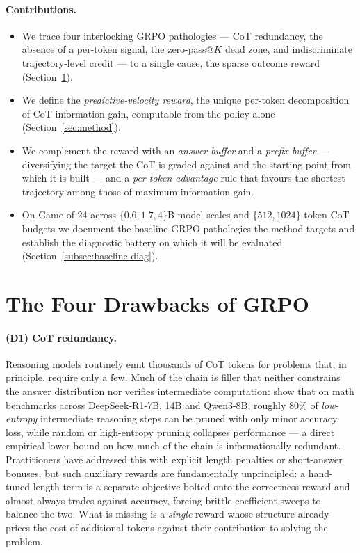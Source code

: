 \documentclass{article}
\begin{document}
\paragraph{Contributions.}
\begin{itemize}
  \item We trace four interlocking GRPO pathologies --- CoT
        redundancy, the absence of a per-token signal, the
        zero-pass@\(K\) dead zone, and indiscriminate trajectory-level
        credit --- to a single cause, the sparse outcome reward
        (Section~\ref{sec:problem}).
  \item We define the \emph{predictive-velocity reward}, the unique
        per-token decomposition of CoT information gain, computable
        from the policy alone (Section~\ref{sec:method}).
  \item We complement the reward with an \emph{answer buffer} and a
        \emph{prefix buffer} --- diversifying the target the CoT is
        graded against and the starting point from which it is built
        --- and a \emph{per-token advantage} rule that favours the
        shortest trajectory among those of maximum information gain.
  \item On Game of 24 across \(\{0.6,1.7,4\}\)B model scales and
        \(\{512,1024\}\)-token CoT budgets we document the baseline
        GRPO pathologies the method targets and establish the
        diagnostic battery on which it will be evaluated
        (Section~\ref{subsec:baseline-diag}).
\end{itemize}

\section{The Four Drawbacks of GRPO}
\label{sec:problem}

\paragraph{(D1) CoT redundancy.}
Reasoning models routinely emit thousands of CoT tokens for problems that, in
principle, require only a few. Much of the chain is filler that neither
constrains the answer distribution nor verifies intermediate computation:
\citet{li2025stepentropy} show that on math benchmarks across DeepSeek-R1-7B,
14B and Qwen3-8B, roughly \(80\%\) of \emph{low-entropy} intermediate
reasoning steps can be pruned with only minor accuracy loss, while random or
high-entropy pruning collapses performance --- a direct empirical lower bound
on how much of the chain is informationally redundant.
Practitioners have addressed this with explicit length penalties or
short-answer bonuses, but such auxiliary rewards are fundamentally
unprincipled: a hand-tuned length term is a separate objective bolted onto the
correctness reward and almost always trades against accuracy, forcing
brittle coefficient sweeps to balance the two. What is missing is a
\emph{single} reward whose structure already prices the cost of additional
tokens against their contribution to solving the problem.
\end{document}
